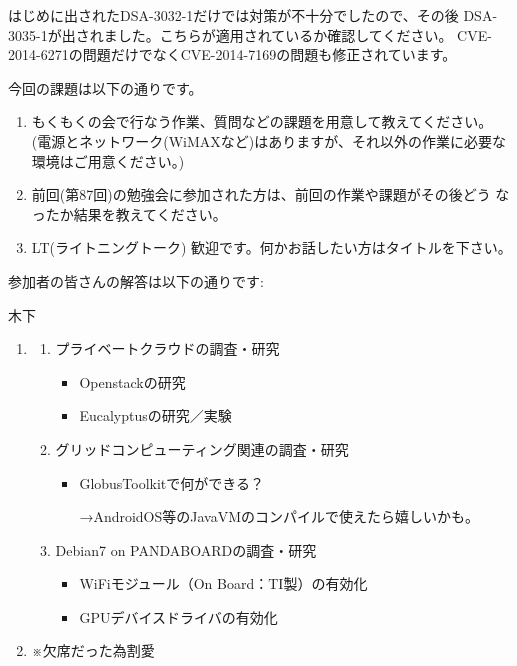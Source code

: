\documentclass[mingoth,a4paper]{jsarticle}
\begin{document}
はじめに出されたDSA-3032-1だけでは対策が不十分でしたので、その後
DSA-3035-1が出されました。こちらが適用されているか確認してください。
CVE-2014-6271の問題だけでなくCVE-2014-7169の問題も修正されています。



今回の課題は以下の通りです。
\begin{screen}
  \begin{enumerate}

  \item %
    もくもくの会で行なう作業、質問などの課題を用意して教えてください。
    (電源とネットワーク(WiMAXなど)はありますが、それ以外の作業に必要な
    環境はご用意ください。)

  \item %
    前回(第87回)の勉強会に参加された方は、前回の作業や課題がその後どう
    なったか結果を教えてください。

  \item %
    LT(ライトニングトーク) 歓迎です。何かお話したい方はタイトルを下さい。

  \end{enumerate}
\end{screen}

参加者の皆さんの解答は以下の通りです:

\begin{prework}{ 木下 }
  \begin{enumerate}
  \item
    \begin{enumerate}
    \item プライベートクラウドの調査・研究
      \begin{itemize}
      \item Openstackの研究
      \item Eucalyptusの研究／実験
      \end{itemize}
    \item グリッドコンピューティング関連の調査・研究
      \begin{itemize}
      \item GlobusToolkitで何ができる？

        →AndroidOS等のJavaVMのコンパイルで使えたら嬉しいかも。
      \end{itemize}
    \item Debian7 on PANDABOARDの調査・研究
      \begin{itemize}
      \item WiFiモジュール（On Board：TI製）の有効化
      \item GPUデバイスドライバの有効化
      \end{itemize}
    \end{enumerate}
  \item ※欠席だった為割愛
  \end{enumerate}
\end{prework}
\end{document}
